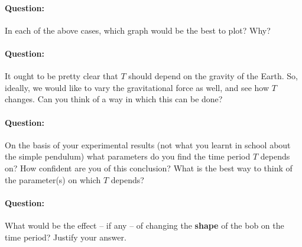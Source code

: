 \begin{question}
\paragraph{Question:} In each of the above cases, which graph would be the best to plot? Why?

\paragraph{Question:} It ought to be pretty clear that $T$ should depend on the gravity of the Earth. So, ideally, we would like to vary the gravitational force as well, and see how $T$ changes. Can you think of a way in which this can be done?

\paragraph{Question:} On the basis of your experimental results (not what you learnt in school about the simple pendulum) what parameters do you find the time period $T$ depends on? How confident are you of this conclusion? What is the best way to think of the parameter(s) on which $T$ depends?

\paragraph{Question:} What would be the effect -- if any -- of changing the \textbf{shape} of the bob on the time period? Justify your answer.
\end{question}












\newpage